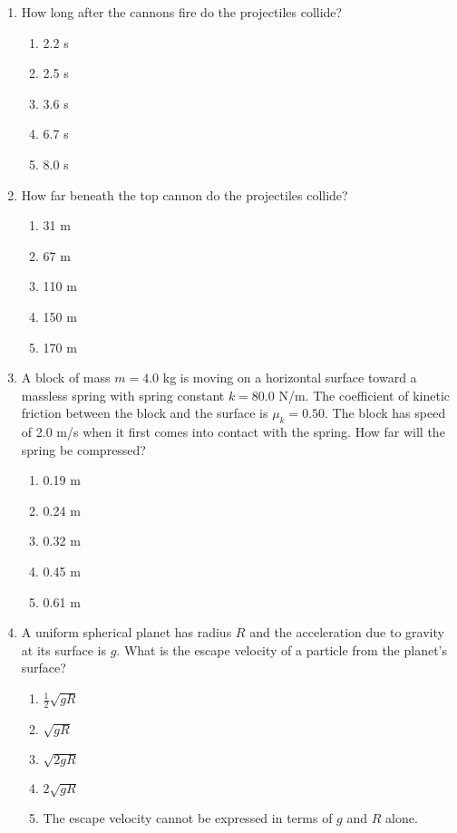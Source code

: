 \documentclass[12pt,letterpaper]{article}
\begin{document}
\begin{enumerate}[resume]
\item
How long after the cannons fire do the projectiles collide?
\begin{enumerate}
\item 2.2 s
\item 2.5 s
\item 3.6 s
\item 6.7 s
\item 8.0 s
\end{enumerate}

\item
How far beneath the top cannon do the projectiles collide?
\begin{enumerate}
\item 31 m
\item 67 m
\item 110 m
\item 150 m
\item 170 m
\end{enumerate}

\item
A block of mass $m = 4.0$ kg is moving on a horizontal surface toward a massless spring with spring constant $k = 80.0$ N/m. The coefficient of kinetic friction between the block and the surface is $\mu_k = 0.50$. The block has speed of 2.0 m/s when it first comes into contact with the spring. How far will the spring be compressed?
\begin{enumerate}
\item 0.19 m
\item 0.24 m
\item 0.32 m
\item 0.45 m
\item 0.61 m
\end{enumerate}

\item
A uniform spherical planet has radius $R$ and the acceleration due to gravity at its surface is $g$. What is the escape velocity of a particle from the planet's surface?
\begin{enumerate}
\item $\frac{1}{2}\sqrt{gR}$
\item $\sqrt{gR}$
\item $\sqrt{2gR}$
\item $2\sqrt{gR}$
\item The escape velocity cannot be expressed in terms of $g$ and $R$ alone.
\end{enumerate}


\end{enumerate}
\end{document}
